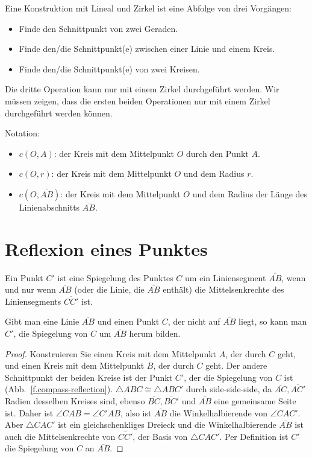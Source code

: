 Eine Konstruktion mit Lineal und Zirkel ist eine Abfolge von drei Vorgängen:
\begin{itemize}
\item Finde den Schnittpunkt von zwei Geraden.
\item Finde den/die Schnittpunkt(e) zwischen einer Linie und einem Kreis.
\item Finde den/die Schnittpunkt(e) von zwei Kreisen.
\end{itemize}
Die dritte Operation kann nur mit einem Zirkel durchgeführt werden. Wir müssen zeigen, dass die ersten beiden Operationen nur mit einem Zirkel durchgeführt werden können.

\noindent{}Notation:
\begin{itemize}
\item $c(O,A)$: der Kreis mit dem Mittelpunkt $O$ durch den Punkt $A$.
\item $c(O,r)$: der Kreis mit dem Mittelpunkt $O$ und dem Radius $r$.
\item $c(O,\overline{AB})$: der Kreis mit dem Mittelpunkt $O$ und dem Radius der Länge des Linienabschnitts $\overline{AB}$.
\end{itemize}


\section{Reflexion eines Punktes}\label{s.reflection}

\begin{definition}
Ein Punkt $C'$ ist eine Spiegelung des Punktes $C$ um ein Liniensegment $\overline{AB}$, wenn und nur wenn $\overline{AB}$ (oder die Linie, die $\overline{AB}$ enthält) die Mittelsenkrechte des Liniensegments $\overline{CC'}$ ist.
\end{definition}

\begin{theorem}\label{thm.compass-reflection}
Gibt man eine Linie $\overline{AB}$ und einen Punkt $C$, der nicht auf $\overline{AB}$ liegt, so kann man $C'$, die Spiegelung von $C$ um $\overline{AB}$ herum bilden.
\end{theorem}

\begin{proof} 
Konstruieren Sie einen Kreis mit dem Mittelpunkt $A$, der durch $C$ geht, und einen Kreis mit dem Mittelpunkt $B$, der durch $C$ geht. Der andere Schnittpunkt der beiden Kreise ist der Punkt $C'$, der die Spiegelung von $C$ ist (Abb.~\ref{f.compass-reflection}).
$\triangle ABC \cong \triangle ABC'$ durch side-side-side, da $\overline{AC}, \overline{AC'}$ Radien desselben Kreises sind, ebenso $\overline{BC}, \overline{BC'}$ und $\overline{AB}$ eine gemeinsame Seite ist. Daher ist $\angle CAB = \angle C'AB$, also ist $\overline{AB}$ die Winkelhalbierende von $\angle CAC'$. Aber $\triangle CAC'$ ist ein gleichschenkliges Dreieck und die Winkelhalbierende $\overline{AB}$ ist auch die Mittelsenkrechte von $\overline{CC'}$, der Basis von $\triangle CAC'$. Per Definition ist $C'$ die Spiegelung von $C$ an $\overline{AB}$.
\end{proof}

